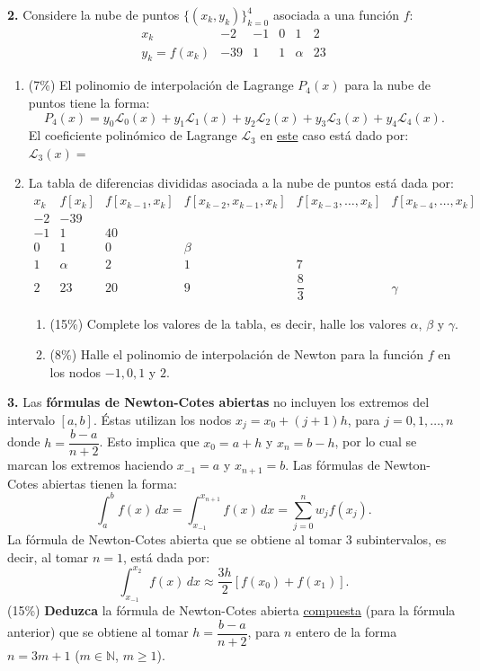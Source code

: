 \documentclass[11pt]{article}
\begin{document}
\vspace{5mm}
\noindent\textbf{2.} Considere la nube de puntos $\{(x_k,y_k)\}_{k=0}^4$ asociada a una función $f$:
\[
\begin{array}{c|c|c|c|c|c}
x_k & -2 & -1 & 0 & 1 & 2\\ \hline
y_k=f(x_k) & -39 & 1 & 1 & \alpha & 23
\end{array}
\]
\begin{enumerate}
\item[a.] (7\%) El polinomio de interpolación de Lagrange $P_4(x)$ para la nube de puntos tiene la forma:
\[
P_4(x)=y_0\mathcal{L}_0(x)+y_1\mathcal{L}_1(x)+y_2\mathcal{L}_2(x)+y_3\mathcal{L}_3(x)+y_4\mathcal{L}_4(x).
\]
El coeficiente polinómico de Lagrange $\mathcal{L}_3$ en \underline{este} caso está dado por: $\mathcal{L}_3(x)=$~\underline{\hspace{4cm}}
\item[b.] La tabla de diferencias divididas asociada a la nube de puntos está dada por:
\[
\begin{array}{c|c|c|c|c|c}
x_k & f[x_k] & f[x_{k-1},x_k] & f[x_{k-2},x_{k-1},x_k] & f[x_{k-3},\ldots,x_k] & f[x_{k-4},\ldots,x_k]\\ \hline
-2 & -39 & & & & \\
-1 & 1 & 40 & & & \\
0 & 1 & 0 & \beta & & \\
1 & \alpha & 2 & 1 & 7 & \\
2 & 23 & 20 & 9 & \dfrac83 & \gamma
\end{array}
\]
\begin{enumerate}
\item[i.] (15\%) Complete los valores de la tabla, es decir, halle los valores $\alpha$, $\beta$ y $\gamma$.
\item[ii.] (8\%) Halle el polinomio de interpolación de Newton para la función $f$ en los nodos $-1,0,1$ y $2$.
\end{enumerate}
\end{enumerate}

\vspace{5mm}
\noindent\textbf{3.} Las \textbf{fórmulas de Newton-Cotes abiertas} no incluyen los extremos del intervalo $[a,b]$. Éstas utilizan los nodos $x_j=x_0+(j+1)h$, para $j=0,1,\ldots,n$ donde $h=\dfrac{b-a}{n+2}$. Esto implica que $x_0=a+h$ y $x_n=b-h$, por lo cual se marcan los extremos haciendo $x_{-1}=a$ y $x_{n+1}=b$. Las fórmulas de Newton-Cotes abiertas tienen la forma:
\[
\int_a^b f(x)\,dx=\int_{x_{-1}}^{x_{n+1}} f(x)\,dx=\sum_{j=0}^n w_jf(x_j).
\]
La fórmula de Newton-Cotes abierta que se obtiene al tomar 3 subintervalos, es decir, al tomar $n=1$, está dada por:
\[
\int_{x_{-1}}^{x_2} f(x)\,dx\approx\frac{3h}2\left[f(x_0)+f(x_1)\right].
\]
(15\%) \textbf{Deduzca} la fórmula de Newton-Cotes abierta \underline{compuesta} (para la fórmula anterior) que se obtiene al tomar $h=\dfrac{b-a}{n+2}$, para $n$ entero de la forma $n=3m+1$ ($m\in\mathbb{N}$, $m\geq1$).
\end{document}
